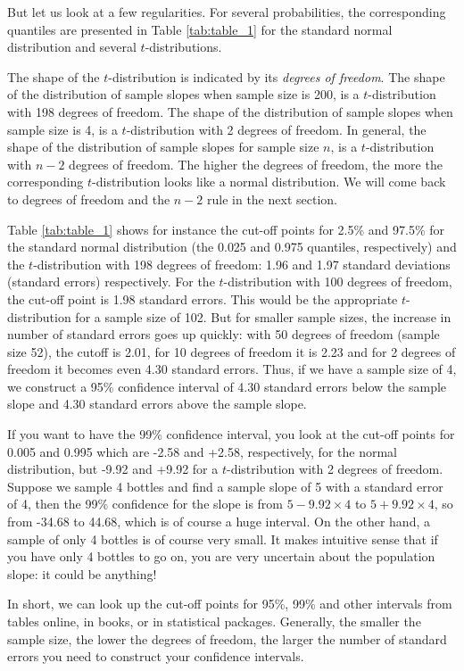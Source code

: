 \documentclass[]{report}\usepackage[]{graphicx}\usepackage[]{color}
\begin{document}
But let us look at a few regularities. For several probabilities, the corresponding quantiles are presented in Table \ref{tab:table_1} for the standard normal distribution and several $t$-distributions.

The shape of the $t$-distribution is indicated by its \textit{degrees of freedom}. The shape of the distribution of sample slopes when sample size is 200, is a $t$-distribution with 198 degrees of freedom. The shape of the distribution of sample slopes when sample size is 4, is a $t$-distribution with 2 degrees of freedom. In general, the shape of the distribution of sample slopes for sample size $n$, is a $t$-distribution with $n-2$ degrees of freedom. The higher the degrees of freedom, the more the corresponding $t$-distribution looks like a normal distribution. We will come back to degrees of freedom and the $n-2$ rule in the next section.

Table \ref{tab:table_1} shows for instance the cut-off points for 2.5\% and 97.5\% for the standard normal distribution (the 0.025 and 0.975 quantiles, respectively) and the $t$-distribution with 198 degrees of freedom: 1.96 and 1.97 standard deviations (standard errors) respectively. For the $t$-distribution with 100 degrees of freedom, the cut-off point is 1.98 standard errors. This would be the appropriate $t$-distribution for a sample size of 102. But for smaller sample sizes, the increase in number of standard errors goes up quickly: with 50 degrees of freedom (sample size 52), the cutoff is 2.01, for 10 degrees of freedom it is 2.23 and for 2 degrees of freedom it becomes even 4.30 standard errors. Thus, if we have a sample size of 4, we construct a 95\% confidence interval of 4.30 standard errors below the sample slope and 4.30 standard errors above the sample slope.

If you want to have the 99\% confidence interval, you look at the cut-off points for 0.005 and 0.995 which are -2.58 and +2.58, respectively, for the normal distribution, but -9.92 and +9.92 for a $t$-distribution with 2 degrees of freedom. Suppose we sample 4 bottles and find a sample slope of 5 with a standard error of 4, then the 99\% confidence for the slope is from $5-9.92\times 4$ to $5+9.92\times 4$, so from -34.68 to 44.68, which is of course a huge interval. On the other hand, a sample of only 4 bottles is of course very small. It makes intuitive sense that if you have only 4 bottles to go on, you are very uncertain about the population slope: it could be anything!

In short, we can look up the cut-off points for 95\%, 99\% and other intervals from tables online, in books, or in statistical packages. Generally, the smaller the sample size, the lower the degrees of freedom, the larger the number of standard errors you need to construct your confidence intervals.
\end{document}
